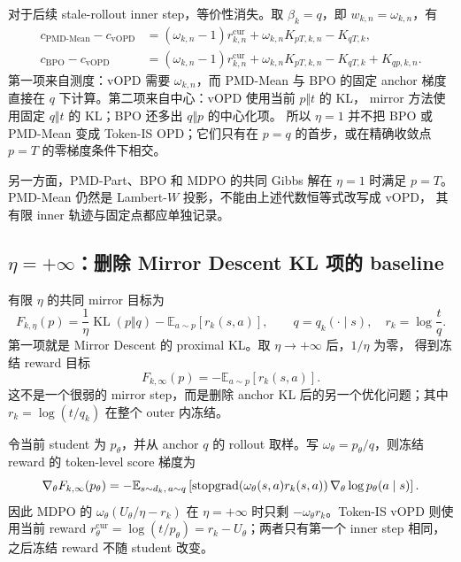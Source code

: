 对于后续 stale-rollout inner step，等价性消失。取 $\beta_k=q$，即 $w_{k,n}=\omega_{k,n}$，有
\begin{align}
c_{\mathrm{PMD\text{-}Mean}}-c_{\mathrm{vOPD}}
&=(\omega_{k,n}-1)r_{k,n}^{\mathrm{cur}}
 +\omega_{k,n}K_{pT,k,n}-K_{qT,k},\\
c_{\mathrm{BPO}}-c_{\mathrm{vOPD}}
&=(\omega_{k,n}-1)r_{k,n}^{\mathrm{cur}}
 +\omega_{k,n}K_{pT,k,n}-K_{qT,k}
 +K_{qp,k,n}.
\end{align}
第一项来自测度：vOPD 需要 $\omega_{k,n}$，而 PMD-Mean 与 BPO 的固定 anchor 梯度直接在 $q$ 下计算。第二项来自中心：vOPD 使用当前 $p\Vert t$ 的 KL， mirror 方法使用固定 $q\Vert t$ 的 KL；BPO 还多出 $q\Vert p$ 的中心化项。 所以 $\eta=1$ 并不把 BPO 或 PMD-Mean 变成 Token-IS OPD；它们只有在 $p=q$ 的首步，或在精确收敛点 $p=T$ 的零梯度条件下相交。

另一方面，PMD-Part、BPO 和 MDPO 的共同 Gibbs 解在 $\eta=1$ 时满足 $p=T$。PMD-Mean 仍然是 Lambert-$W$ 投影，不能由上述代数恒等式改写成 vOPD， 其有限 inner 轨迹与固定点都应单独记录。

\subsection{$\eta=+\infty$：删除 Mirror Descent KL 项的 baseline}
\label{subsec:ch2-opd-eta-infinity}

有限 $\eta$ 的共同 mirror 目标为
\begin{equation}
\label{eq:ch2-opd-mirror-objective-eta}
F_{k,\eta}(p)=\frac{1}{\eta}\operatorname{KL}(p\Vert q)-\mathbb E_{a\sim p}[r_k(s,a)],
\qquad q=q_k(\cdot\mid s),\quad r_k=\log\frac{t}{q}.
\end{equation}
第一项就是 Mirror Descent 的 proximal KL。取 $\eta\to+\infty$ 后，$1/\eta$ 为零， 得到冻结 reward 目标
\begin{equation}
\label{eq:ch2-opd-frozen-reward-objective}
F_{k,\infty}(p)=-\mathbb E_{a\sim p}[r_k(s,a)].
\end{equation}
这不是一个很弱的 mirror step，而是删除 anchor KL 后的另一个优化问题；其中 $r_k=\log(t/q_k)$ 在整个 outer 内冻结。

令当前 student 为 $p_\theta$，并从 anchor $q$ 的 rollout 取样。写 $\omega_\theta=p_\theta/q$，则冻结 reward 的 token-level score 梯度为
\begin{equation}
\label{eq:ch2-opd-frozen-reward-gradient}
\nabla_\theta F_{k,\infty}(p_\theta)
=-\mathbb E_{s\sim d_k,\,a\sim q}
\left[\operatorname{stopgrad}\!\left(\omega_\theta(s,a)r_k(s,a)\right)
\nabla_\theta\log p_\theta(a\mid s)\right].
\end{equation}
因此 MDPO 的 $\omega_\theta(U_\theta/\eta-r_k)$ 在 $\eta=+\infty$ 时只剩 $-\omega_\theta r_k$。Token-IS vOPD 则使用当前 reward $r_\theta^{\mathrm{cur}}=\log(t/p_\theta)=r_k-U_\theta$；两者只有第一个 inner step 相同，之后冻结 reward 不随 student 改变。

